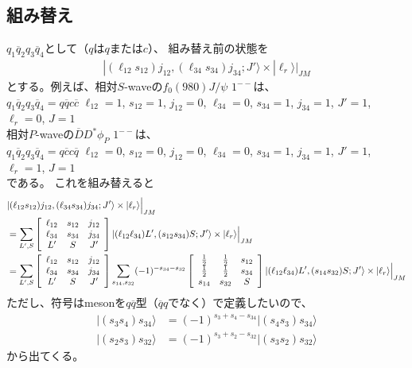 \documentclass[a4j]{jarticle}
\def\ket{\rangle}
\def\Jpsi{{J\!/\!\psi}{}}
\def\cbar{\overline{{c}}}
\def\qbar{\overline{{q}}}
\def\Dbar{\overline{{D}}{}}
\def\half#1{\text{${#1\over 2}$}}
\newcommand{\U}[9]{\left[\begin{array}{ccc}#1&#2&#3\\#4&#5&#6\\#7&#8&#9\\ \end{array}\right]}
\begin{document}
\subsection{組み替え}


$q_1\qbar_2 q_3\qbar_4$として（$q$は$q$または$c$）、
組み替え前の状態を
\begin{align}
|(\ell_{12}s_{12})j_{12},(\ell_{34}s_{34})j_{34};J'\ket \times|\ell_r\ket \Big|_{JM}
\end{align}
とする。例えば、相対$S$-waveの$f_0(980)\Jpsi $ $1^{--}$は、\\
$q_1\qbar_2 q_3\qbar_4=q\qbar c\cbar$
$\ell_{12}=1$, $s_{12}=1$, $j_{12}=0$, $\ell_{34}=0$, $s_{34}=1$, $j_{34}=1$, $J'=1$, $\ell_r=0$, $J=1$\\
相対$P$-waveの$\Dbar D^*\phi_P $ $1^{--}$は、\\
$q_1\qbar_2 q_3\qbar_4=q\cbar c\qbar$
$\ell_{12}=0$, $s_{12}=0$, $j_{12}=0$, $\ell_{34}=0$, $s_{34}=1$, $j_{34}=1$, 
$J'=1$, $\ell_r=1$, $J=1$\\
である。
これを組み替えると
\begin{align}
\lefteqn{|(\ell_{12}s_{12})j_{12},(\ell_{34}s_{34})j_{34};J'\ket \times|\ell_r\ket \Big|_{JM}}&\\
&=
\sum_{L',S}
\U{\ell_{12}}{s_{12}}{j_{12}}{\ell_{34}}{s_{34}}{j_{34}}{L'}{S}{J'}
|(\ell_{12}\ell_{34})L',(s_{12}s_{34})S;J'\ket\times|\ell_r\ket \Big|_{JM}
\\
&=\sum_{L',S}
\U{\ell_{12}}{s_{12}}{j_{12}}{\ell_{34}}{s_{34}}{j_{34}}{L'}{S}{J'}
\sum_{s_{14},s_{32}}
(-1)^{-s_{34}-s_{32}}
\U{\half1}{\half1}{s_{12}}{\half1}{\half1}{s_{34}}{s_{14}}{s_{32}}{S}
|(\ell_{12}\ell_{34})L',(s_{14}s_{32})S;J'\ket\times|\ell_r\ket \Big|_{JM}
\end{align}
ただし、符号はmesonを$q\qbar$型（$\qbar q$でなく）で定義したいので、
\begin{align}
|(s_3 s_4)s_{34}\ket & = (-1)^{s_3+s_4-s_{34}}|(s_4 s_3)s_{34}\ket 
\\
|(s_2 s_3)s_{32}\ket & = (-1)^{s_3+s_2-s_{32}}|(s_3 s_2)s_{32}\ket 
\end{align}
から出てくる。
\end{document}

